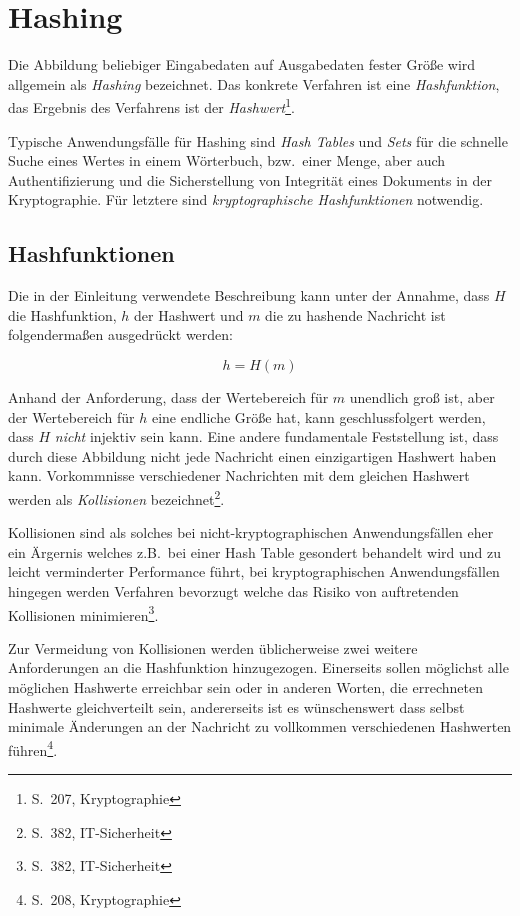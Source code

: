 \author{Autor: Vasilij Schneidermann}
\chapter{Hashing}

Die Abbildung beliebiger Eingabedaten auf Ausgabedaten fester Größe
wird allgemein als \emph{Hashing} bezeichnet.  Das konkrete Verfahren
ist eine \emph{Hashfunktion}, das Ergebnis des Verfahrens ist der
\emph{Hashwert}\footnote{S.~207, Kryptographie}.

Typische Anwendungsfälle für Hashing sind \emph{Hash Tables} und
\emph{Sets} für die schnelle Suche eines Wertes in einem Wörterbuch,
bzw.~einer Menge, aber auch Authentifizierung und die Sicherstellung
von Integrität eines Dokuments in der Kryptographie.  Für letztere
sind \emph{kryptographische Hashfunktionen} notwendig.

\section{Hashfunktionen}

Die in der Einleitung verwendete Beschreibung kann unter der Annahme,
dass $H$ die Hashfunktion, $h$ der Hashwert und $m$ die zu hashende
Nachricht ist folgendermaßen ausgedrückt werden:

$$h = H(m)$$

Anhand der Anforderung, dass der Wertebereich für $m$ unendlich groß
ist, aber der Wertebereich für $h$ eine endliche Größe hat, kann
geschlussfolgert werden, dass $H$ \emph{nicht} injektiv sein kann.
Eine andere fundamentale Feststellung ist, dass durch diese Abbildung
nicht jede Nachricht einen einzigartigen Hashwert haben kann.
Vorkommnisse verschiedener Nachrichten mit dem gleichen Hashwert
werden als \emph{Kollisionen} bezeichnet\footnote{S.~382,
  IT-Sicherheit}.

Kollisionen sind als solches bei nicht-kryptographischen
Anwendungsfällen eher ein Ärgernis welches z.B.~bei einer Hash Table
gesondert behandelt wird und zu leicht verminderter Performance führt,
bei kryptographischen Anwendungsfällen hingegen werden Verfahren
bevorzugt welche das Risiko von auftretenden Kollisionen
minimieren\footnote{S.~382, IT-Sicherheit}.

Zur Vermeidung von Kollisionen werden üblicherweise zwei weitere
Anforderungen an die Hashfunktion hinzugezogen.  Einerseits sollen
möglichst alle möglichen Hashwerte erreichbar sein oder in anderen
Worten, die errechneten Hashwerte gleichverteilt sein, andererseits
ist es wünschenswert dass selbst minimale Änderungen an der Nachricht
zu vollkommen verschiedenen Hashwerten führen\footnote{S.~208,
  Kryptographie}.

